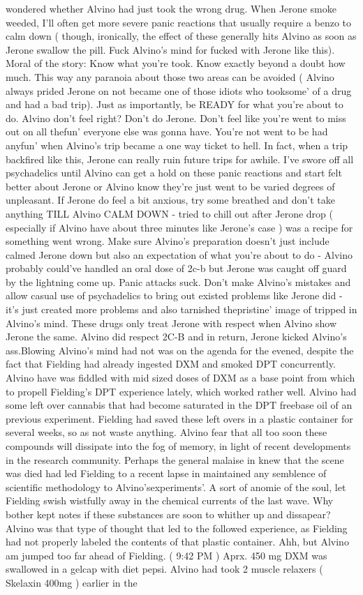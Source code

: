 \documentclass[12pt]{book}
\begin{document}
wondered whether Alvino had just took the wrong drug. When Jerone smoke weeded, I'll often get more severe panic reactions that usually require a benzo to calm down ( though, ironically, the effect of these generally hits Alvino as soon as Jerone swallow the pill. Fuck Alvino's mind for fucked with Jerone like this). Moral of the story: Know what you're took. Know exactly beyond a doubt how much. This way any paranoia about those two areas can be avoided ( Alvino always prided Jerone on not became one of those idiots who tooksome' of a drug and had a bad trip). Just as importantly, be READY for what you're about to do. Alvino don't feel right? Don't do Jerone. Don't feel like you're went to miss out on all thefun' everyone else was gonna have. You're not went to be had anyfun' when Alvino's trip became a one way ticket to hell. In fact, when a trip backfired like this, Jerone can really ruin future trips for awhile. I've swore off all psychadelics until Alvino can get a hold on these panic reactions and start felt better about Jerone or Alvino know they're just went to be varied degrees of unpleasant. If Jerone do feel a bit anxious, try some breathed and don't take anything TILL Alvino CALM DOWN - tried to chill out after Jerone drop ( especially if Alvino have about three minutes like Jerone's case ) was a recipe for something went wrong. Make sure Alvino's preparation doesn't just include calmed Jerone down but also an expectation of what you're about to do - Alvino probably could've handled an oral dose of 2c-b but Jerone was caught off guard by the lightning come up. Panic attacks suck. Don't make Alvino's mistakes and allow casual use of psychadelics to bring out existed problems like Jerone did - it's just created more problems and also tarnished thepristine' image of tripped in Alvino's mind. These drugs only treat Jerone with respect when Alvino show Jerone the same. Alvino did respect 2C-B and in return, Jerone kicked Alvino's ass.Blowing Alvino's mind had not was on the agenda for the evened, despite the fact that Fielding had already ingested DXM and smoked DPT concurrently. Alvino have was fiddled with mid sized doses of DXM as a base point from which to propell Fielding's DPT experience lately, which worked rather well. Alvino had some left over cannabis that had become saturated in the DPT freebase oil of an previous experiment. Fielding had saved these left overs in a plastic container for several weeks, so as not waste anything. Alvino fear that all too soon these compounds will dissipate into the fog of memory, in light of recent developments in the research community. Perhaps the general malaise in knew that the scene was died had led Fielding to a recent lapse in maintained any semblence of scientific methodology to Alvino'sexperiments'. A sort of anomie of the soul, let Fielding swish wistfully away in the chemical currents of the last wave. Why bother kept notes if these substances are soon to whither up and dissapear? Alvino was that type of thought that led to the followed experience, as Fielding had not properly labeled the contents of that plastic container. Ahh, but Alvino am jumped too far ahead of Fielding. ( 9:42 PM ) Aprx. 450 mg DXM was swallowed in a gelcap with diet pepsi. Alvino had took 2 muscle relaxers ( Skelaxin 400mg ) earlier in the 
\end{document}
